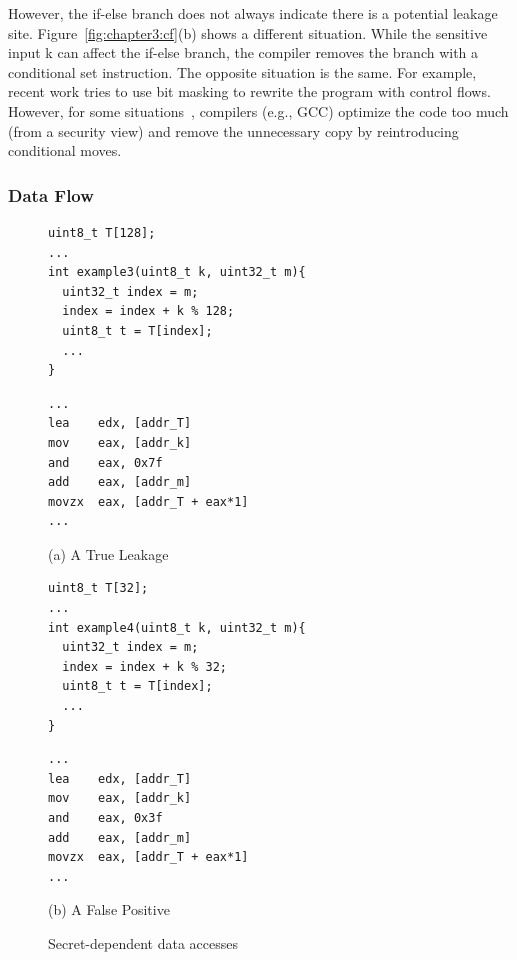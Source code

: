 However, the if-else branch does not always indicate there is a potential leakage site. Figure~\ref{fig:chapter3:cf}(b) shows a different situation. While the sensitive input \textsf{k} can affect the if-else branch, the compiler removes the branch with a conditional set instruction.  The opposite situation is the same. For example, recent work tries to use bit masking to rewrite the program with control flows. However, for some situations~\cite{Coppens:2009:PMT:1607723.1608124}, compilers (e.g., GCC) optimize the code too much (from a security view) and remove the unnecessary copy by reintroducing conditional moves.
\subsubsection{Data Flow}
\begin{figure}[ht]
  \begin{minipage}{0.4\linewidth}
    \begin{lstlisting}[xleftmargin=.15\textwidth, xrightmargin=.0\textwidth, frame=none]
uint8_t T[128];
...
int example3(uint8_t k, uint32_t m){
  uint32_t index = m;
  index = index + k % 128;
  uint8_t t = T[index];
  ...
}
\end{lstlisting}
  \end{minipage}
  \hfill
  \begin{minipage}{0.4\linewidth}
    \begin{lstlisting}[xleftmargin=.15\textwidth, xrightmargin=.00\textwidth, frame=none, numbers=none, mathescape=true]
...
lea    edx, [addr_T]
mov    eax, [addr_k]
and    eax, 0x7f
add    eax, [addr_m]
movzx  eax, [addr_T + eax*1]
...
\end{lstlisting}
  \end{minipage}\caption*{(a) A True Leakage}

  \begin{minipage}{0.4\linewidth}
    \begin{lstlisting}[xleftmargin=.15\textwidth, xrightmargin=.0\textwidth, frame=none]
uint8_t T[32];
...
int example4(uint8_t k, uint32_t m){
  uint32_t index = m;
  index = index + k % 32;
  uint8_t t = T[index];
  ...
}
\end{lstlisting}
  \end{minipage}
  \hfill
  \begin{minipage}{0.4\linewidth}
    \begin{lstlisting}[xleftmargin=.15\textwidth, xrightmargin=.00\textwidth, frame=none, numbers=none, mathescape=true]
...
lea    edx, [addr_T]
mov    eax, [addr_k]
and    eax, 0x3f
add    eax, [addr_m]
movzx  eax, [addr_T + eax*1]
...
\end{lstlisting}
  \end{minipage}\caption*{(b) A False Positive}
  \caption{Secret-dependent data accesses}\label{fig:chapter3:da}
\end{figure}

